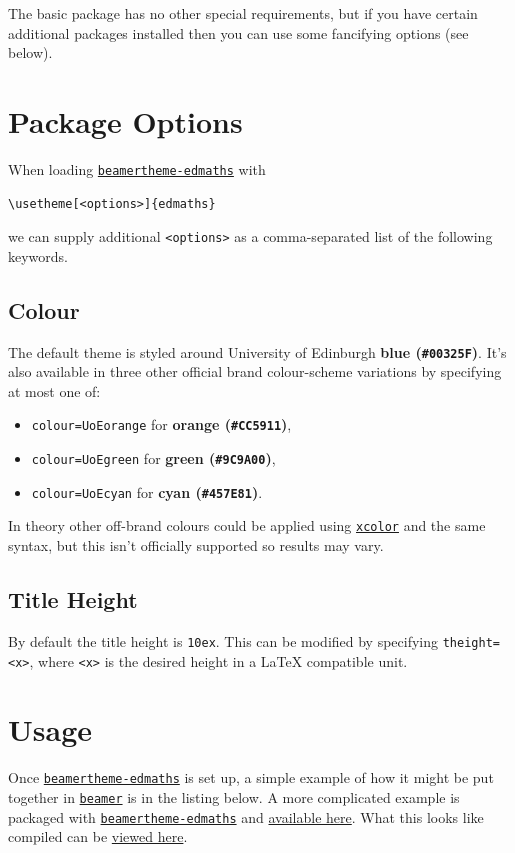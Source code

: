 \documentclass[12pt]{article}
\newcommand\pkg[1]{\href{https://www.ctan.org/pkg/#1}{\color{teal}\lstinline{#1}}}
\newcommand\key[1]{{\color{orange}\lstinline|#1|}}
\begin{document}
The basic package has no other special requirements, but if you have certain additional packages installed then you can use some fancifying options (see below).

\section{Package Options}

When loading \pkg{beamertheme-edmaths} with
\begin{lstlisting}
\usetheme[<options>]{edmaths}
\end{lstlisting}
we can supply additional \key{<options>} as a comma-separated list of the following keywords.

\subsection{Colour}

The default theme is styled around University of Edinburgh {\bf\color[HTML]{00325F} blue (\lstinline|#00325F|)}. It's also available in three other official brand colour-scheme variations by specifying at most one of:
\begin{itemize}
    \item \key{colour=UoEorange} for {\bf\color[HTML]{CC5911} orange (\lstinline|#CC5911|)},
    \item \key{colour=UoEgreen} for {\bf\color[HTML]{9C9A00} green (\lstinline|#9C9A00|)},
    \item \key{colour=UoEcyan} for {\bf\color[HTML]{457E81} cyan (\lstinline|#457E81|)}.
\end{itemize}
In theory other off-brand colours could be applied using \pkg{xcolor} and the same syntax, but this isn't officially supported so results may vary.

\subsection{Title Height}

By default the title height is \key{10ex}. This can be modified by specifying \key{theight=<x>}, where \key{<x>} is the desired height in a \LaTeX{} compatible unit.

\section{Usage}

Once \pkg{beamertheme-edmaths} is set up, a simple example of how it might be put together in \pkg{beamer} is in the listing below. A more complicated example is packaged with \pkg{beamertheme-edmaths} and \href{https://github.com/Foggalong/edinburgh-math-latex/blob/main/example-presentation.tex}{available here}. What this looks like compiled can be \href{https://foggalong.github.io/edinburgh-math-latex/example-presentation.pdf}{viewed here}.
\end{document}
